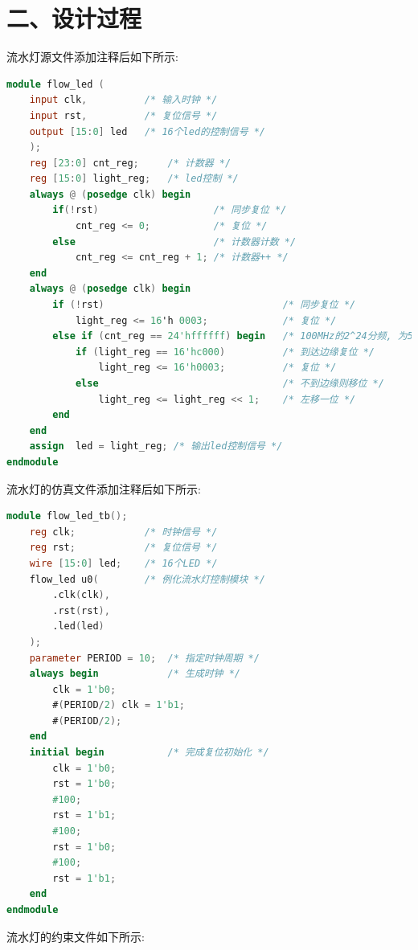 \documentclass{article}
\newcommand{\fourhao}{\fontsize{14pt}{\baselineskip}\selectfont} %
\newcommand{\xiaosihao}{\fontsize{12pt}{\baselineskip}\selectfont} %
\begin{document}
\section*{\fourhao 二、设计过程}
\xiaosihao
{}
流水灯源文件添加注释后如下所示:
\begin{lstlisting}[language=Verilog, caption={流水灯源文件}]
module flow_led (
    input clk,          /* 输入时钟 */
    input rst,          /* 复位信号 */
    output [15:0] led   /* 16个led的控制信号 */
    );
    reg [23:0] cnt_reg;     /* 计数器 */
    reg [15:0] light_reg;   /* led控制 */
    always @ (posedge clk) begin
        if(!rst)                    /* 同步复位 */
            cnt_reg <= 0;           /* 复位 */
        else                        /* 计数器计数 */
            cnt_reg <= cnt_reg + 1; /* 计数器++ */
    end
    always @ (posedge clk) begin
        if (!rst)                               /* 同步复位 */
            light_reg <= 16'h 0003;             /* 复位 */
        else if (cnt_reg == 24'hffffff) begin   /* 100MHz的2^24分频, 为5.9Hz */
            if (light_reg == 16'hc000)          /* 到达边缘复位 */
                light_reg <= 16'h0003;          /* 复位 */
            else                                /* 不到边缘则移位 */
                light_reg <= light_reg << 1;    /* 左移一位 */
        end
    end
    assign  led = light_reg; /* 输出led控制信号 */
endmodule
\end{lstlisting}
\newpage
流水灯的仿真文件添加注释后如下所示:
\begin{lstlisting}[language=Verilog, caption={流水灯仿真文件}]
module flow_led_tb();
    reg clk;            /* 时钟信号 */
    reg rst;            /* 复位信号 */
    wire [15:0] led;    /* 16个LED */
    flow_led u0(        /* 例化流水灯控制模块 */
        .clk(clk),
        .rst(rst),
        .led(led)
    );
    parameter PERIOD = 10;  /* 指定时钟周期 */
    always begin            /* 生成时钟 */
        clk = 1'b0;
        #(PERIOD/2) clk = 1'b1;
        #(PERIOD/2);
    end
    initial begin           /* 完成复位初始化 */
        clk = 1'b0;
        rst = 1'b0;
        #100;
        rst = 1'b1;
        #100;
        rst = 1'b0;
        #100;
        rst = 1'b1;
    end
endmodule
\end{lstlisting}
流水灯的约束文件如下所示:
\end{document}
